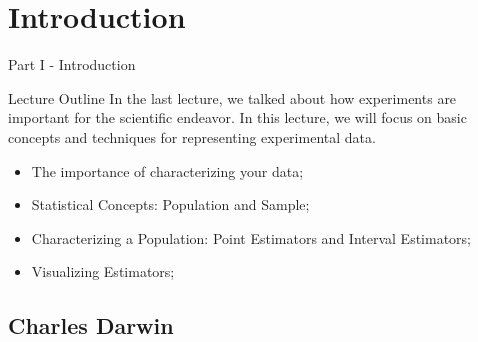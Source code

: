 
\section{Introduction}
\begin{frame}
  \begin{center}
    Part I - Introduction
  \end{center}
\end{frame}

\begin{frame}{Lecture Outline}
  In the last lecture, we talked about how experiments are important for the scientific endeavor. In this lecture, we will focus on basic concepts and techniques for representing experimental data.\bigskip

  \begin{itemize}
    \item The importance of characterizing your data;
    \item Statistical Concepts: Population and Sample;
    \item Characterizing a Population: Point Estimators and Interval Estimators;
    \item Visualizing Estimators;
  \end{itemize}
\end{frame}

\subsection{Charles Darwin}

